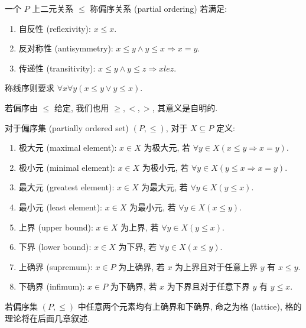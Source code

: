 \begin{definition}
    一个 \(P\) 上二元关系 \(\le\) 称偏序关系 (partial ordering) 若满足:

    \begin{enumerate}
        \item 自反性 (reflexivity): \(x \le x\).
        \item 反对称性 (antisymmetry): \(x \le y \wedge y \le x \Rightarrow x = y\).
        \item 传递性 (transitivity): \(x \le y \wedge y \le z \Rightarrow x le z\).
    \end{enumerate}

    称线序则要求 \(\forall x \forall y (x \le y \vee y \le x)\).

    若偏序由 \(\le\) 给定, 我们也用 \(\ge, <, >\), 其意义是自明的.
\end{definition}

\begin{definition}
    对于偏序集 (partially ordered set) \((P, \le)\), 对于 \(X \subseteq P\) 定义:
    \begin{enumerate}
        \item 极大元 (maximal element): \(x \in X\) 为极大元, 若 \(\forall y \in X (x \le y \Rightarrow x = y)\).
        \item 极小元 (minimal element): \(x \in X\) 为极小元, 若 \(\forall y \in X (y \le x \Rightarrow x = y)\).
        \item 最大元 (greatest element): \(x \in X\) 为最大元, 若 \(\forall y \in X (y \le x)\).
        \item 最小元 (least element): \(x \in X\) 为最小元, 若 \(\forall y \in X (x \le y)\).
        \item 上界 (upper bound): \(x \in X\) 为上界, 若 \(\forall y \in X (y \le x)\).
        \item 下界 (lower bound): \(x \in X\) 为下界, 若 \(\forall y \in X (x \le y)\).
        \item 上确界 (supremum): \(x \in P\) 为上确界, 若 \(x\) 为上界且对于任意上界 \(y\) 有 \(x \le y\).
        \item 下确界 (infimum): \(x \in P\) 为下确界, 若 \(x\) 为下界且对于任意下界 \(y\) 有 \(y \le x\).
    \end{enumerate}
\end{definition}

\begin{definition}
    若偏序集 \((P, \le)\) 中任意两个元素均有上确界和下确界, 命之为格 (lattice), 格的理论将在后面几章叙述.
\end{definition}

